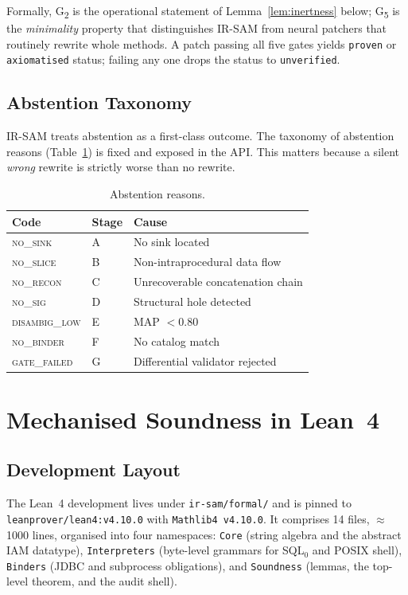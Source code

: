 \documentclass[conference]{IEEEtran}
\newcommand{\IRSAM}{\textsc{IR-SAM}}
\begin{document}
Formally, G\textsubscript{2} is the operational statement of
Lemma~\ref{lem:inertness} below; G\textsubscript{5} is the
\emph{minimality} property that distinguishes \IRSAM{} from neural
patchers that routinely rewrite whole methods.  A patch passing all
five gates yields \texttt{proven} or \texttt{axiomatised} status;
failing any one drops the status to \texttt{unverified}.

\subsection{Abstention Taxonomy}\label{ssec:abstain}

\IRSAM{} treats abstention as a first-class outcome. The taxonomy of
abstention reasons (Table~\ref{tab:abstain}) is fixed and exposed in
the API.  This matters because a silent
\emph{wrong} rewrite is strictly worse than no rewrite.

\begin{table}[t]
\caption{Abstention reasons.}\label{tab:abstain}
\centering\small
\begin{tabular}{lll}
\toprule
Code & Stage & Cause \\
\midrule
\textsc{no\_sink}        & A & No sink located \\
\textsc{no\_slice}       & B & Non-intraprocedural data flow \\
\textsc{no\_recon}       & C & Unrecoverable concatenation chain \\
\textsc{no\_sig}         & D & Structural hole detected \\
\textsc{disambig\_low}   & E & MAP $< 0.80$ \\
\textsc{no\_binder}      & F & No catalog match \\
\textsc{gate\_failed}    & G & Differential validator rejected \\
\bottomrule
\end{tabular}
\end{table}

\section{Mechanised Soundness in Lean~4}\label{sec:formal}

\subsection{Development Layout}
The Lean~4 development lives under \texttt{ir-sam/formal/} and is
pinned to \texttt{leanprover/lean4:v4.10.0} with
\texttt{Mathlib4~v4.10.0}.  It comprises 14 files, $\approx$1000
lines, organised into four namespaces: \texttt{Core} (string algebra
and the abstract IAM datatype), \texttt{Interpreters}
(byte-level grammars for SQL${}_0$ and POSIX shell),
\texttt{Binders} (JDBC and subprocess obligations), and
\texttt{Soundness} (lemmas, the top-level theorem, and the audit
shell).
\end{document}
